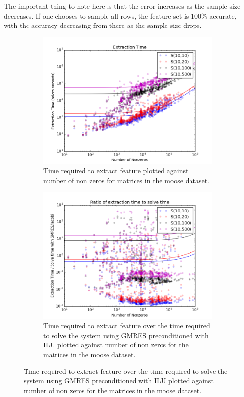 The important thing to note here is that the error increases as the sample size decreases.  If one chooses to sample all rows, the feature set is 100\% accurate, with the accuracy decreasing from there as the sample size drops. 

\begin{figure}[h]
    \centering
    \begin{subfigure}{0.475\textwidth}
     \centering 
     \includegraphics[width=\textwidth]{figures/figure5.png}
     \caption{Time required to extract feature plotted against number of non zeros for matrices in the moose dataset. }
     \label{3accuracy0}
     \end{subfigure}
    \hfill
    \begin{subfigure}{0.475\textwidth}
     \centering 
     \includegraphics[width=\textwidth]{figures/figure6.png}
     \caption{Time required to extract feature over the time required to solve the system using GMRES preconditioned with ILU plotted against number of non zeros for the matrices in the moose dataset. }
     \label{3accuracy1}
     \end{subfigure}
\end{figure}


